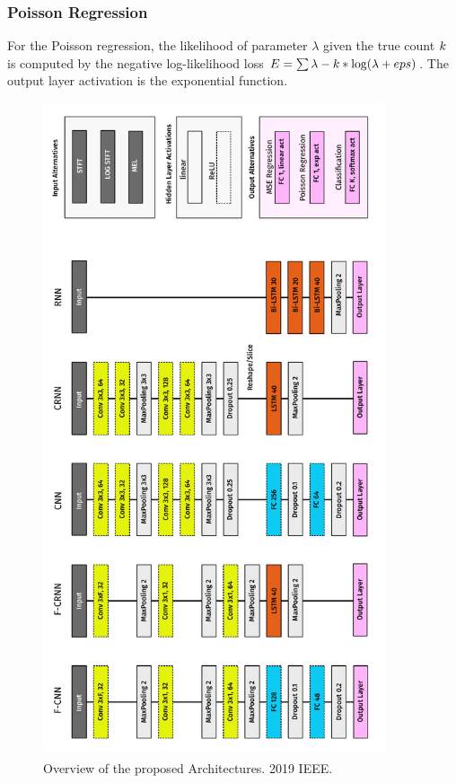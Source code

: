 \subsubsection{Poisson Regression}
For the Poisson regression, the likelihood of parameter \(\lambda \) given the true count \(k \) is computed by the negative log-likelihood loss \(E = \sum \lambda - k * \log(\lambda + eps)\). The output layer activation is the exponential function.

\begin{figure}[!hp]
\centering
\includegraphics[width=0.9\textwidth]{Chapters/08_Analysis_CountNet/figures/networkoverview.pdf}
\caption{Overview of the proposed Architectures. \textsuperscript{\textregistered}2019 IEEE.}%
\label{fig:networkoverview}%
\end{figure}

